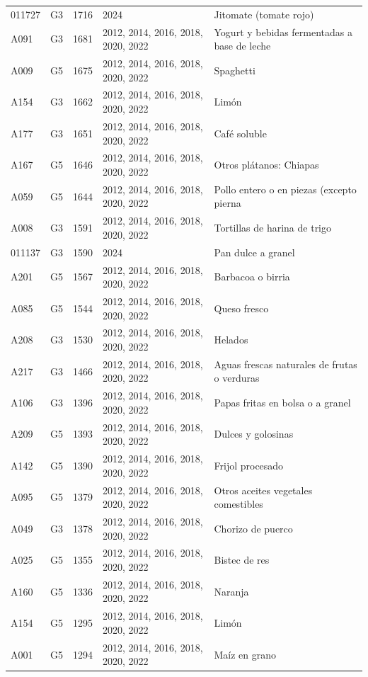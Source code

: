 \begin{table}[ht]
\begin{tabular}{llrll}
  011727 & G3 & 1716 & 2024 & Jitomate (tomate rojo) \\ 
  A091 & G3 & 1681 & 2012, 2014, 2016, 2018, 2020, 2022 & Yogurt y bebidas fermentadas a base de leche \\ 
  A009 & G5 & 1675 & 2012, 2014, 2016, 2018, 2020, 2022 & Spaghetti \\ 
  A154 & G3 & 1662 & 2012, 2014, 2016, 2018, 2020, 2022 & Limón \\ 
  A177 & G3 & 1651 & 2012, 2014, 2016, 2018, 2020, 2022 & Café soluble \\ 
  A167 & G5 & 1646 & 2012, 2014, 2016, 2018, 2020, 2022 & Otros plátanos: Chiapas \\ 
  A059 & G5 & 1644 & 2012, 2014, 2016, 2018, 2020, 2022 & Pollo entero o en piezas (excepto pierna \\ 
  A008 & G3 & 1591 & 2012, 2014, 2016, 2018, 2020, 2022 & Tortillas de harina de trigo \\ 
  011137 & G3 & 1590 & 2024 & Pan dulce a granel \\ 
  A201 & G5 & 1567 & 2012, 2014, 2016, 2018, 2020, 2022 & Barbacoa o birria \\ 
  A085 & G5 & 1544 & 2012, 2014, 2016, 2018, 2020, 2022 & Queso fresco \\ 
  A208 & G3 & 1530 & 2012, 2014, 2016, 2018, 2020, 2022 & Helados \\ 
  A217 & G3 & 1466 & 2012, 2014, 2016, 2018, 2020, 2022 & Aguas frescas naturales de frutas o verduras \\ 
  A106 & G3 & 1396 & 2012, 2014, 2016, 2018, 2020, 2022 & Papas fritas en bolsa o a granel \\ 
  A209 & G5 & 1393 & 2012, 2014, 2016, 2018, 2020, 2022 & Dulces y golosinas \\ 
  A142 & G5 & 1390 & 2012, 2014, 2016, 2018, 2020, 2022 & Frijol procesado \\ 
  A095 & G5 & 1379 & 2012, 2014, 2016, 2018, 2020, 2022 & Otros aceites vegetales comestibles \\ 
  A049 & G3 & 1378 & 2012, 2014, 2016, 2018, 2020, 2022 & Chorizo de puerco \\ 
  A025 & G5 & 1355 & 2012, 2014, 2016, 2018, 2020, 2022 & Bistec de res \\ 
  A160 & G5 & 1336 & 2012, 2014, 2016, 2018, 2020, 2022 & Naranja \\ 
  A154 & G5 & 1295 & 2012, 2014, 2016, 2018, 2020, 2022 & Limón \\ 
  A001 & G5 & 1294 & 2012, 2014, 2016, 2018, 2020, 2022 & Maíz en grano \\ 

\end{tabular}
\end{table}
